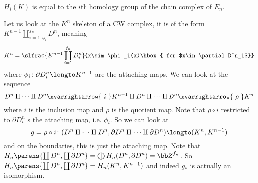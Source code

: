 \bthrm

    $H_i(K)$ is equal to the $i$th homology group of the chain complex of $E_n$.

\ethrm

Let us look at the $K^n$ skeleton of a CW complex, it is of the form $K^{n-1}\coprod_{i=1,\phi_i}^{f_n}D^n$, meaning
$$ K^n = \slfrac{K^{n-1}\coprod_{i=1}^{f_n}D^n_i}{x\sim\phi_i(x)\hbox{ for $x\in\partial D^n_i$}} $$
where $\phi_i\colon\partial D^n_i\longto K^{n-1}$ are the attaching maps.
We can look at the sequence
$$ D^n\amalg\cdots\amalg D^n \xvarrightarrow{\ i\ } K^{n-1}\amalg D^n\amalg\cdots\amalg D^n \xvarrightarrow{\ \rho\ } K^n $$
where $i$ is the inclusion map and $\rho$ is the quotient map.
Note that $\rho\circ i$ restricted to $\partial D^n_i$ s the attaching map, i.e. $\phi_i$.
So we can look at
$$ g = \rho\circ i\colon (D^n\amalg\cdots\amalg D^n,\partial D^n\amalg\cdots\amalg\partial D^n) \longto (K^n,K^{n-1}) $$
and on the boundaries, this is just the attaching map.
Note that $H_n\parens{\coprod D^n,\coprod\partial D^n}=\bigoplus H_n(D^n,\partial D^n)={\bb Z}^{f_n}$.
So $H_n\parens{\coprod D^n,\coprod\partial D^n}=H_n(K^n,K^{n-1})$ and indeed $g_*$ is actually an isomorphism.

